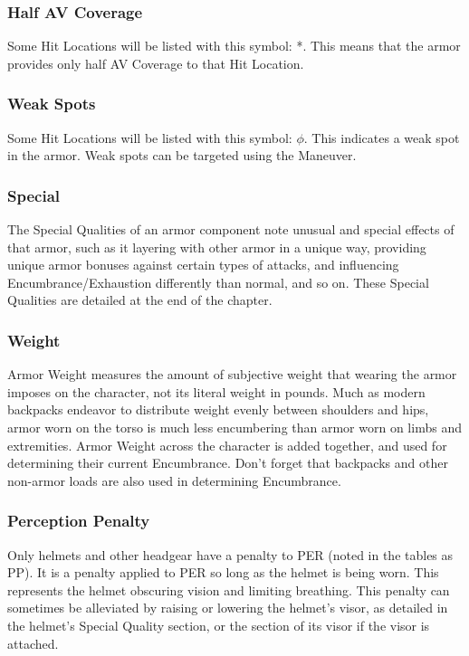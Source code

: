 \documentclass[oneside,11pt,english]{book}
\begin{document}
\subsubsection{Half AV Coverage}
Some Hit Locations will be listed with this symbol: *. This means that the armor provides only half AV Coverage to that Hit Location. 

\subsubsection{Weak Spots}\label{sec:Weak Spots}
Some Hit Locations will be listed with this symbol: $\phi$. This indicates a
weak spot in the armor. Weak spots can be targeted using the  Maneuver. 

\subsubsection{Special}
The Special Qualities of an armor component note unusual and special effects of
that armor, such as it layering with other armor in a unique way, providing
unique armor bonuses against certain types of attacks, and influencing
Encumbrance/Exhaustion differently than normal, and so on. These Special
Qualities are detailed at the end of the chapter. 

\subsubsection{Weight}
Armor Weight measures the amount of subjective weight that wearing the armor imposes on the character, not its 
literal weight in pounds. Much as modern backpacks endeavor to distribute weight evenly between shoulders and hips,
armor worn on the torso is much less encumbering than armor worn on limbs and extremities.
Armor Weight across the character is added together, and used for determining their current Encumbrance. Don’t 
forget that backpacks and other non-armor loads are also used in determining Encumbrance.

\subsubsection{Perception Penalty}
Only helmets and other headgear have a penalty to PER (noted in the tables as
PP). It is a penalty applied to PER so long as the helmet is being worn. This
represents the helmet obscuring vision and limiting breathing. This penalty can
sometimes be alleviated by raising or lowering the helmet’s visor, as detailed
in the helmet’s Special Quality section, or the section of its visor if the
visor is attached. 
\end{document}
